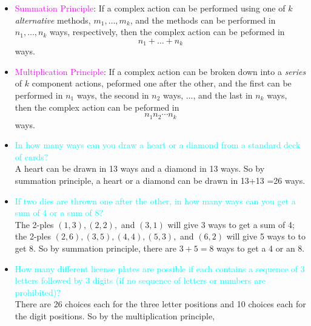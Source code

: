 \documentclass[20pt,landscape]{foils}
\newcommand{\bul}{\hspace*{.3in}{\textcolor{red}{$\bullet$ \ }}}
\begin{document}
{{\foilhead[-.75in]{\textcolor{blue}{Two Basic Counting Principles}}
\addtolength{\itemsep}{-0.8\baselineskip}
\begin{itemize} 
\item[\bul]{\textcolor{magenta}{Summation Principle}}: If a complex action can be performed using one of $k$ \emph{ alternative } methods, $m_{1}, \ldots, m_{k}$, and the methods can be performed in $n_{1}, \ldots, n_{k}$ ways, respectively, then the complex action can be peformed in \begin{displaymath}n_{1}+ \ldots + n_{k}  \end{displaymath}
ways.
\item[\bul]{\textcolor{magenta}{Multiplication Principle}}: If a complex action can be broken down into a \emph{ series } of $k$ component actions, peformed one after the other, and the first can be performed in $n_{1}$ ways, the second in $n_{2}$ ways, $\ldots$, and the last in $n_{k}$ ways, then the complex action can be peformed in \begin{displaymath} n_{1}n_{2}\cdots n_{k} \end{displaymath}
ways.
\end{itemize}
\foilhead[-.8in]{\textcolor{blue}{Summation Principle Examples}}
\begin{itemize} 
\item[\bul] {\textcolor{cyan}{In how many ways can you draw a heart or a diamond from a standard deck of cards?}}\\[.1in]
A heart can be drawn in 13 ways and a diamond  in 13 ways. So by summation principle, a heart or a diamond can be drawn in 13+13 =26 ways.
\item[\bul] {\textcolor{cyan}{If two dies are thrown one after the other, in how many ways can you get a sum of 4 or a sum of 8?}}\\[.1in]
The 2-ples $(1,3),(2,2),$ and $(3,1)$ will give 3 ways to get a sum of 4; 
the 2-ples $(2,6),(3,5),(4,4),(5,3),$ and $(6,2)$ will give 5 ways to to get 8. So by summation principle, there are $3+5=8$ ways to get a 4 or an 8.
\end{itemize}
\foilhead[-.8in]{\textcolor{blue}{Multiplication Principle Examples}}
\begin{itemize} 
\item[\bul] {\textcolor{cyan}{How many different license plates are possible if each contains a sequence of 3 letters followed by 3 digits (if no sequence of letters or numbers are prohibited)?}}\\[.1in]
There are 26 choices each for the three letter positions and 10 choices each for the digit positions. So by the multiplication principle,

\end{itemize}}}
\end{document}
